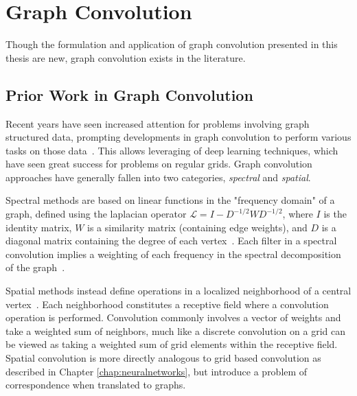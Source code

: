 \section{Graph Convolution}
Though the formulation and application of graph convolution presented in this thesis are new, graph convolution exists in the literature.


\subsection{Prior Work in Graph Convolution}
Recent years have seen increased attention for problems involving graph structured data, prompting developments in graph convolution to perform various tasks on those data~\cite{bronstein2016}.
This allows leveraging of deep learning techniques, which have seen great success for problems on regular grids.
Graph convolution approaches have generally fallen into two categories, \textit{spectral} and \textit{spatial}.

Spectral methods are based on linear functions in the "frequency domain" of a graph, defined using the laplacian operator $\mathcal{L}=I-D^{-1/2}WD^{-1/2}$, where $I$ is the identity matrix, $W$ is a similarity matrix (containing edge weights), and $D$ is a diagonal matrix containing the degree of each vertex~\cite{bruna2013, henaff2015, kipf2016}.
Each filter in a spectral convolution implies a weighting of each frequency in the spectral decomposition of the graph~\cite{mallat2009}.

Spatial methods instead define operations in a localized neighborhood of a central vertex~\cite{henaff2015, atwood2016diffusion}.
Each neighborhood constitutes a receptive field where a convolution operation is performed. 
Convolution commonly involves a vector of weights and take a weighted sum of neighbors, much like a discrete convolution on a grid can be viewed as taking a weighted sum of grid elements within the receptive field.
Spatial convolution is more directly analogous to grid based convolution as described in Chapter \ref{chap:neuralnetworks}, but introduce a problem of correspondence when translated to graphs.

